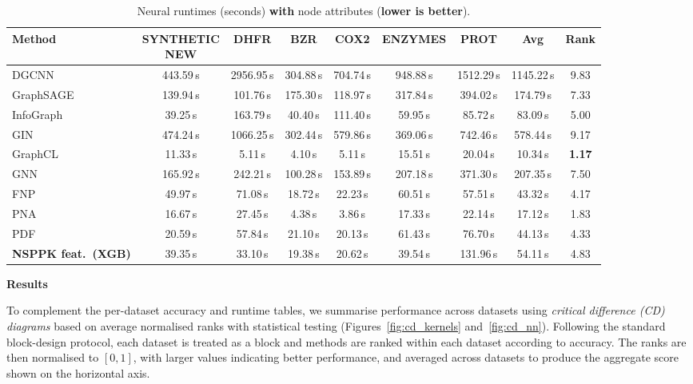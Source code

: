 \begin{table}[H]
\centering
\caption{Neural runtimes (seconds) \textbf{with} node attributes (\textbf{lower is better}).}
\label{tab:with_attr_runtime_nns}
\scriptsize
\setlength{\tabcolsep}{3.5pt}
\begin{adjustbox}{max width=\textwidth}
\begin{tabular}{lcccccccc}
\toprule
\textbf{Method} & \makecell{\textbf{SYNTHETIC}\\\textbf{NEW}} & \textbf{DHFR} & \textbf{BZR} & \textbf{COX2} & \textbf{ENZYMES} & \textbf{PROT} & \textbf{Avg} & \textbf{Rank}\\
\midrule
DGCNN & 443.59\,s & 2956.95\,s & 304.88\,s & 704.74\,s & 948.88\,s & 1512.29\,s & 1145.22\,s & 9.83\\
GraphSAGE & 139.94\,s & 101.76\,s & 175.30\,s & 118.97\,s & 317.84\,s & 394.02\,s & 174.79\,s & 7.33\\
InfoGraph & 39.25\,s & 163.79\,s & 40.40\,s & 111.40\,s & 59.95\,s & 85.72\,s & 83.09\,s & 5.00\\
GIN & 474.24\,s & 1066.25\,s & 302.44\,s & 579.86\,s & 369.06\,s & 742.46\,s & 578.44\,s & 9.17\\
GraphCL & 11.33\,s & 5.11\,s & 4.10\,s & 5.11\,s & 15.51\,s & 20.04\,s & 10.34\,s & \textbf{1.17}\\
GNN & 165.92\,s & 242.21\,s & 100.28\,s & 153.89\,s & 207.18\,s & 371.30\,s & 207.35\,s & 7.50\\
FNP & 49.97\,s & 71.08\,s & 18.72\,s & 22.23\,s & 60.51\,s & 57.51\,s & 43.32\,s & 4.17\\
PNA & 16.67\,s & 27.45\,s & 4.38\,s & 3.86\,s & 17.33\,s & 22.14\,s & 17.12\,s & 1.83\\
PDF & 20.59\,s & 57.84\,s & 21.10\,s & 20.13\,s & 61.43\,s & 76.70\,s & 44.13\,s & 4.33\\
\rowcolor{gray!10}
\textbf{NSPPK feat.\ (XGB)} & 39.35\,s & 33.10\,s & 19.38\,s & 20.62\,s & 39.54\,s & 131.96\,s & 54.11\,s & 4.83\\
\bottomrule
\end{tabular}
\end{adjustbox}
\end{table}

\textbf{Results}

To complement the per-dataset accuracy and runtime tables, we summarise
performance across datasets using \emph{critical difference (CD) diagrams} based
on average normalised ranks with statistical testing
(Figures~\ref{fig:cd_kernels} and~\ref{fig:cd_nn}). Following the standard
block-design protocol, each dataset is treated as a block and methods are ranked
within each dataset according to accuracy. The ranks are then normalised to
$[0,1]$, with larger values indicating better performance, and averaged across
datasets to produce the aggregate score shown on the horizontal axis.

